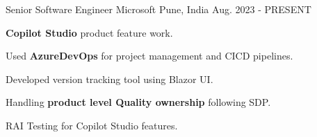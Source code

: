 

\begin{cventries}

  \cventry
    {Senior Software Engineer} %
    {Microsoft} %
    {Pune, India} %
    {Aug. 2023 - PRESENT} %
    {
      \begin{cvitems} %
	    \item {\textbf{Copilot Studio} product feature work.}
	    \item {Used \textbf{AzureDevOps} for project management and CICD pipelines.}
	    \item {Developed version tracking tool using Blazor UI.}
	    \item {Handling \textbf{product level Quality ownership} following SDP.}
	    \item {RAI Testing for Copilot Studio features.}
      \end{cvitems}
    }


\end{cventries}
